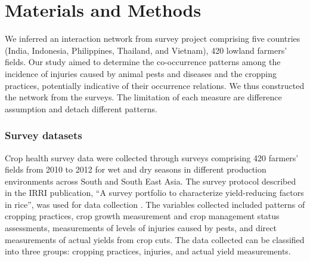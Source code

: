 \documentclass[a4paper]{article}
\begin{document}

\section*{Materials and Methods}

We inferred an interaction network from survey project comprising five countries (India, Indonesia, Philippines, Thailand, and Vietnam), 420 lowland farmers' fields. Our study aimed to determine the co-occurrence patterns among the incidence of injuries caused by animal pests and diseases and the cropping practices, potentially indicative of their occurrence relations. We thus constructed the network from the surveys. The limitation of each measure are difference assumption and detach different patterns.

\subsubsection*{Survey datasets}
Crop health survey data were collected through surveys comprising 420 farmers' fields from 2010 to 2012 for wet and dry seasons in different production environments across South and South East Asia. The survey protocol described in the IRRI publication, ``A survey  portfolio to characterize yield-reducing factors in rice'', was used for data collection \citep{Savarysurvey2009}. The variables collected included patterns of cropping practices, crop growth measurement and crop management status assessments, measurements of levels of injuries caused by pests, and direct measurements of actual yields from crop cuts. The data collected can be classified into three groups: cropping practices, injuries, and actual yield measurements.
\end{document}
